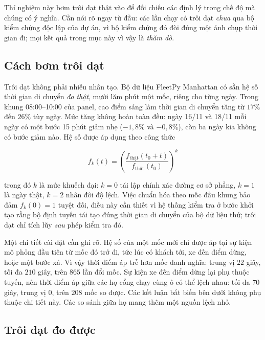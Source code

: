 Thí nghiệm này bơm trôi dạt thật vào để đối chiếu các định lý trong chế độ mà chúng có ý nghĩa.
Cần nói rõ ngay từ đầu: các lần chạy có trôi dạt \emph{chưa} qua bộ kiểm chứng độc lập của dự án,
vì bộ kiểm chứng đó đòi đúng một ảnh chụp thời gian đi; mọi kết quả trong mục này vì vậy là
\emph{thăm dò}.

\subsection{Cách bơm trôi dạt}

Trôi dạt không phải nhiễu nhân tạo. Bộ dữ liệu FleetPy Manhattan có sẵn hệ số thời gian di
chuyển \emph{đo thật}, mười lăm phút một mốc, riêng cho từng ngày. Trong khung 08:00--10:00 của
panel, cao điểm sáng làm thời gian di chuyển tăng từ $17\%$ đến $26\%$ tùy ngày. Mức tăng không hoàn
toàn đều: ngày 16/11 và 18/11 mỗi ngày có một bước 15 phút giảm nhẹ ($-1{,}8\%$ và $-0{,}8\%$), còn ba
ngày kia không có bước giảm nào. Hệ số được áp dụng theo công thức

\begin{equation}
f_k(t) = \left( \frac{f_{\text{thật}}(t_0 + t)}{f_{\text{thật}}(t_0)} \right)^{k}
\end{equation}

trong đó $k$ là mức khuếch đại: $k=0$ tái lập chính xác đường cơ sở phẳng, $k=1$ là ngày thật,
$k=2$ nhân đôi độ lệch. Việc chuẩn hóa theo mốc đầu khung bảo đảm $f_k(0) = 1$ tuyệt đối, điều
này cần thiết vì hệ thống kiểm tra ở bước khởi tạo rằng bộ định tuyến tái tạo đúng thời gian di
chuyển của bộ dữ liệu thử; trôi dạt chỉ tích lũy \emph{sau} phép kiểm tra đó.

Một chi tiết cài đặt cần ghi rõ. Hệ số của một mốc mới chỉ được áp tại sự kiện mô phỏng đầu tiên từ
mốc đó trở đi, tức lúc có khách tới, xe đến điểm dừng, hoặc một bước xả. Vì vậy thời điểm áp trễ hơn
mốc danh nghĩa: trung vị $22$ giây, tối đa $210$ giây, trên $865$ lần đổi mốc. Sự kiện xe đến điểm
dừng lại phụ thuộc tuyến, nên thời điểm áp giữa các họ cổng chạy cùng ô có thể lệch nhau: tối đa $70$
giây, trung vị $0$, trên $208$ mốc so được. Các kết luận bất biến bên dưới không phụ thuộc chi tiết
này. Các so sánh giữa họ mang thêm một nguồn lệch nhỏ.

\subsection{Trôi dạt đo được}

